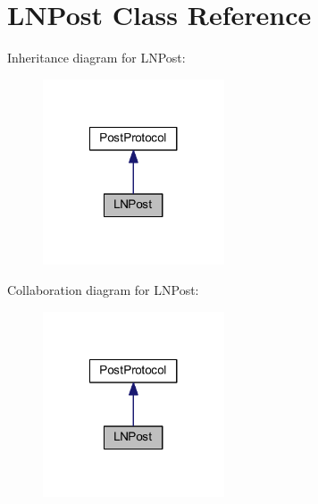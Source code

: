 \hypertarget{class_l_n_post}{\section{L\-N\-Post Class Reference}
\label{class_l_n_post}
}


Inheritance diagram for L\-N\-Post\-:\nopagebreak
\begin{figure}[H]
\begin{center}
\leavevmode
\includegraphics[width=152pt]{class_l_n_post__inherit__graph}
\end{center}
\end{figure}


Collaboration diagram for L\-N\-Post\-:\nopagebreak
\begin{figure}[H]
\begin{center}
\leavevmode
\includegraphics[width=152pt]{class_l_n_post__coll__graph}
\end{center}
\end{figure}
